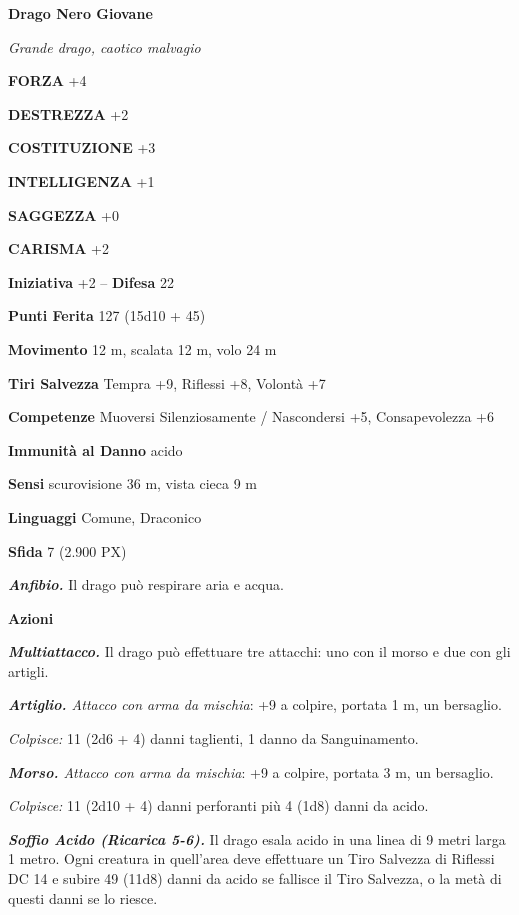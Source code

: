 \begin{multicols}{2}
\medskip{}\textbf{Drago Nero Giovane}

\textit{Grande drago, caotico malvagio}

\textbf{FORZA} +4

\textbf{DESTREZZA} +2

\textbf{COSTITUZIONE} +3

\textbf{INTELLIGENZA} +1

\textbf{SAGGEZZA} +0

\textbf{CARISMA} +2

\textbf{Iniziativa} +2 -- \textbf{Difesa} 22

\textbf{Punti Ferita} 127 (15d10 + 45)

\textbf{Movimento} 12 m, scalata 12 m, volo 24 m

\textbf{Tiri Salvezza} Tempra +9, Riflessi +8, Volontà +7

\textbf{Competenze} Muoversi Silenziosamente / Nascondersi +5, Consapevolezza +6

\textbf{Immunità al Danno} acido

\textbf{Sensi} scurovisione 36 m, vista cieca 9 m

\textbf{Linguaggi} Comune, Draconico

\textbf{Sfida} 7 (2.900 PX)

\textit{\textbf{Anfibio.}} Il drago può respirare aria e acqua.

\textbf{Azioni}

\textit{\textbf{Multiattacco.}} Il drago può effettuare tre attacchi: uno con il morso e due con gli artigli.

\textit{\textbf{Artiglio.} Attacco con arma da mischia}: +9 a colpire, portata 1 m, un bersaglio.

\textit{Colpisce:} 11 (2d6 + 4) danni taglienti, 1 danno da Sanguinamento.

\textit{\textbf{Morso.} Attacco con arma da mischia}: +9 a colpire, portata 3 m, un bersaglio.

\textit{Colpisce:} 11 (2d10 + 4) danni perforanti più 4 (1d8) danni da acido.

\textit{\textbf{Soffio Acido (Ricarica 5-6).}} Il drago esala acido in una linea di 9 metri larga 1 metro. Ogni creatura in quell'area deve effettuare un Tiro Salvezza di Riflessi DC 14 e subire 49 (11d8) danni da acido se fallisce il Tiro Salvezza, o la metà di questi danni se lo riesce.


\end{multicols}
